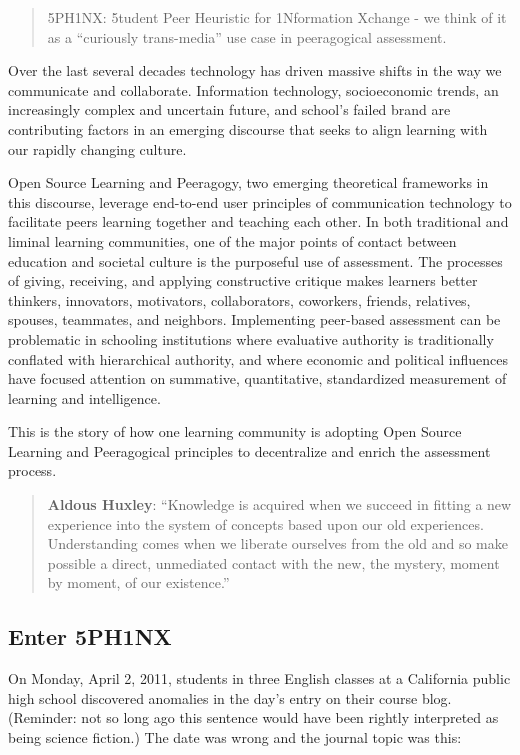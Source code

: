 
\begin{quote}
5PH1NX: 5tudent Peer Heuristic for 1Nformation Xchange - we think of it
as a ``curiously trans-media'' use case in peeragogical assessment.
\end{quote}

Over the last several decades technology has driven massive shifts in
the way we communicate and collaborate. Information technology,
socioeconomic trends, an increasingly complex and uncertain future, and
school's failed brand are contributing factors in an emerging discourse
that seeks to align learning with our rapidly changing culture.

Open Source Learning and Peeragogy, two emerging theoretical frameworks
in this discourse, leverage end-to-end user principles of communication
technology to facilitate peers learning together and teaching each
other. In both traditional and liminal learning communities, one of the
major points of contact between education and societal culture is the
purposeful use of assessment. The processes of giving, receiving, and
applying constructive critique makes learners better thinkers,
innovators, motivators, collaborators, coworkers, friends, relatives,
spouses, teammates, and neighbors. Implementing peer-based assessment
can be problematic in schooling institutions where evaluative authority
is traditionally conflated with hierarchical authority, and where
economic and political influences have focused attention on summative,
quantitative, standardized measurement of learning and intelligence.

This is the story of how one learning community is adopting Open Source
Learning and Peeragogical principles to decentralize and enrich the
assessment process.

\begin{quote}
\textbf{Aldous Huxley}: ``Knowledge is acquired when we succeed in
fitting a new experience into the system of concepts based upon our
old experiences. Understanding comes when we liberate ourselves from
the old and so make possible a direct, unmediated contact with the
new, the mystery, moment by moment, of our existence.''
\end{quote}


\subsection{Enter 5PH1NX}

On Monday, April 2, 2011, students in three English classes at a
California public high school discovered anomalies in the day's entry on
their course blog. (Reminder: not so long ago this sentence would have
been rightly interpreted as being science fiction.) The date was wrong
and the journal topic was this:

